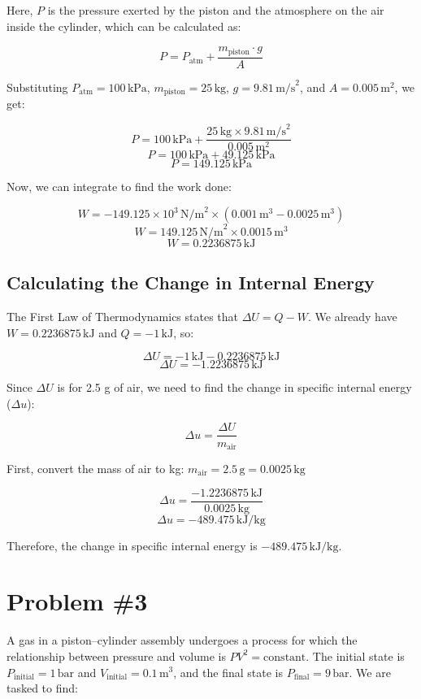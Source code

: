 \documentclass[12pt]{article}
\begin{document}
Here, \( P \) is the pressure exerted by the piston and the atmosphere on the air inside the cylinder, which can be calculated as:

\[
P = P_{\text{atm}} + \frac{m_{\text{piston}} \cdot g}{A}
\]
  
Substituting \( P_{\text{atm}} = 100 \, \text{kPa} \), \( m_{\text{piston}} = 25 \, \text{kg} \), \( g = 9.81 \, \text{m/s}^2 \), and \( A = 0.005 \, \text{m}^2 \), we get:

\[
P = 100 \, \text{kPa} + \frac{25 \, \text{kg} \times 9.81 \, \text{m/s}^2}{0.005 \, \text{m}^2}
\]
\[
P = 100 \, \text{kPa} + 49.125 \, \text{kPa}
\]
\[
P = 149.125 \, \text{kPa}
\]

Now, we can integrate to find the work done:

\[
W = -149.125 \times 10^3 \, \text{N/m}^2 \times (0.001 \, \text{m}^3 - 0.0025 \, \text{m}^3)
\]
\[
W = 149.125 \, \text{N/m}^2 \times 0.0015 \, \text{m}^3
\]
\[
W = 0.2236875 \, \text{kJ}
\]

\subsection*{Calculating the Change in Internal Energy}

The First Law of Thermodynamics states that \( \Delta U = Q - W \). We already have \( W = 0.2236875 \, \text{kJ} \) and \( Q = -1 \, \text{kJ} \), so:

\[
\Delta U = -1 \, \text{kJ} - 0.2236875 \, \text{kJ}
\]
\[
\Delta U = -1.2236875 \, \text{kJ}
\]

Since \( \Delta U \) is for 2.5 g of air, we need to find the change in specific internal energy (\( \Delta u \)):

\[
\Delta u = \frac{\Delta U}{m_{\text{air}}}
\]

First, convert the mass of air to kg: \( m_{\text{air}} = 2.5 \, \text{g} = 0.0025 \, \text{kg} \)

\[
\Delta u = \frac{-1.2236875 \, \text{kJ}}{0.0025 \, \text{kg}}
\]
\[
\Delta u = -489.475 \, \text{kJ/kg}
\]

Therefore, the change in specific internal energy is \( -489.475 \, \text{kJ/kg} \).
\newpage
\section*{Problem \#3}

A gas in a piston--cylinder assembly undergoes a process for which the relationship between pressure and volume is \( PV^2 = \text{constant} \). The initial state is \( P_{\text{initial}} = 1 \, \text{bar} \) and \( V_{\text{initial}} = 0.1 \, \text{m}^3 \), and the final state is \( P_{\text{final}} = 9 \, \text{bar} \). We are tasked to find:
\end{document}
